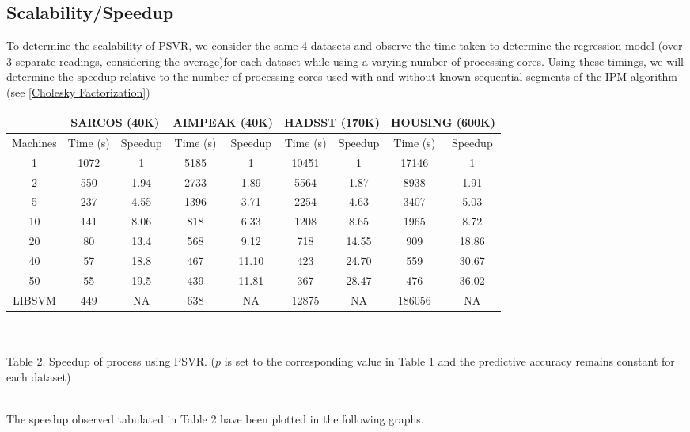 \documentclass[12pt]{article}
\begin{document}
\subsection{Scalability/Speedup}
\label{Scalability/Speedup}
To determine the scalability of PSVR, we consider the same 4 datasets and observe the time taken to determine the regression model (over 3 separate readings, considering the average)for each dataset while using a varying number of processing cores. Using these timings, we will determine the speedup relative to the number of processing cores used with and without known sequential segments of the IPM algorithm (see \ref{Cholesky Factorization})
\begin{center}
\begin{tabular}{ |c|c|c|c|c|c|c|c|c| }
  \hline
   &  \multicolumn{2}{|c|}{SARCOS (40K)} &  \multicolumn{2}{|c|}{AIMPEAK (40K)} & \multicolumn{2}{|c|}{HADSST (170K)}  &  \multicolumn{2}{|c|}{HOUSING (600K)} \\
  \hline
  Machines & Time (s) & Speedup & Time (s) & Speedup & Time (s) & Speedup & Time (s) & Speedup\\
  \hline
  1 & 1072& 1& 5185 & 1&10451 & 1 &17146 & 1 \\
  2 & 550 & 1.94 & 2733 & 1.89 & 5564 & 1.87& 8938 &1.91  \\
  5 & 237 & 4.55 & 1396& 3.71 & 2254 & 4.63 & 3407 & 5.03  \\
  10 & 141& 8.06 & 818 & 6.33 & 1208 & 8.65 & 1965& 8.72\\
  20 & 80& 13.4 & 568 & 9.12& 718 & 14.55 & 909 &  18.86  \\
  40 & 57& 18.8 & 467 & 11.10& 423 & 24.70 & 559& 30.67  \\
  50 & 55 & 19.5 & 	439 & 11.81& 367 & 28.47 & 476 & 36.02 \\
  \hline
  LIBSVM & 449 & NA& 638 & NA & 12875 & NA &186056 & NA\\
  \hline
\end{tabular}
\ \\
\ \\
Table 2. Speedup of process using PSVR. ($p$ is set to the corresponding value in Table 1 and the predictive accuracy remains constant for each dataset)
\end{center}
\ \\
The speedup observed tabulated in Table 2 have been plotted in the following graphs.
\newline\newline
{}
\end{document}
